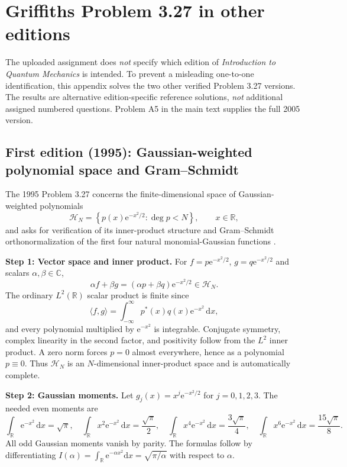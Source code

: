 \documentclass[11pt,a4paper]{article}
\newcommand{\dd}{\mathrm{d}}
\newcommand{\ee}{\mathrm{e}}
\newcommand{\Hil}{\mathcal H}
\newcommand{\R}{\mathbb R}
\begin{document}
\appendix
\section{Griffiths Problem 3.27 in other editions}\label{app:griffiths_variants}
The uploaded assignment does \emph{not} specify which edition of \emph{Introduction to Quantum Mechanics} is intended. To prevent a misleading one-to-one identification, this appendix solves the two other verified Problem 3.27 versions. The results are alternative edition-specific reference solutions, \emph{not} additional assigned numbered questions. Problem A5 in the main text supplies the full 2005 version.

\subsection{First edition (1995): Gaussian-weighted polynomial space and Gram--Schmidt}
The 1995 Problem 3.27 concerns the finite-dimensional space of Gaussian-weighted polynomials
\begin{equation}
\Hil_N=\left\{p(x)\ee^{-x^2/2}:\deg p<N\right\},\qquad x\in\R,
\end{equation}
and asks for verification of its inner-product structure and Gram--Schmidt orthonormalization of the first four natural monomial-Gaussian functions \cite{griffiths1}.

\textbf{Step 1: Vector space and inner product.} For $f=p\ee^{-x^2/2}$, $g=q\ee^{-x^2/2}$ and scalars $\alpha,\beta\in\mathbb C$,
\begin{equation}
\alpha f+\beta g=(\alpha p+\beta q)\ee^{-x^2/2}\in\Hil_N.
\end{equation}
The ordinary $L^2(\R)$ scalar product is finite since
\begin{equation}
\langle f,g\rangle=\int_{-\infty}^{\infty}p^*(x)q(x)\ee^{-x^2}\,\dd x,
\end{equation}
and every polynomial multiplied by $\ee^{-x^2}$ is integrable. Conjugate symmetry, complex linearity in the second factor, and positivity follow from the $L^2$ inner product. A zero norm forces $p=0$ almost everywhere, hence as a polynomial $p\equiv0$. Thus $\Hil_N$ is an $N$-dimensional inner-product space and is automatically complete.

\textbf{Step 2: Gaussian moments.} Let $g_j(x)=x^j\ee^{-x^2/2}$ for $j=0,1,2,3$. The needed even moments are
\begin{equation}
\int_\R\ee^{-x^2}\,\dd x=\sqrt\pi,\quad
\int_\R x^2\ee^{-x^2}\,\dd x=\frac{\sqrt\pi}{2},\quad
\int_\R x^4\ee^{-x^2}\,\dd x=\frac{3\sqrt\pi}{4},\quad
\int_\R x^6\ee^{-x^2}\,\dd x=\frac{15\sqrt\pi}{8}.
\end{equation}
All odd Gaussian moments vanish by parity. The formulas follow by differentiating $I(\alpha)=\int_\R\ee^{-\alpha x^2}\dd x=\sqrt{\pi/\alpha}$ with respect to $\alpha$.
\end{document}

